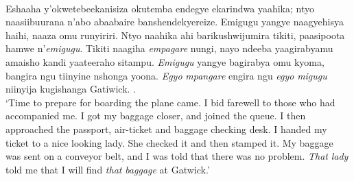 \documentclass[output=paper 		  ]{langscibook}
\begin{document}
\ex%
    \label{ex:asiimwe:51} \citet[207]{Asiimwe2014}\\
   Eshaaha y’okwetebeekanisiza okutemba endegye ekarindwa yaahika; ntyo naasiibuurana n’abo abaabaire banshendekyereize. Emigugu yangye naagyehisya haihi, naaza omu runyiriri. Ntyo naahika ahi barikushwijumira tikiti, paasipoota hamwe n’\emph{emigugu}. Tikiti naagiha \emph{empagare} nungi, nayo ndeeba yaagirabyamu amaisho kandi yaateeraho sitampu. \emph{Emigugu} yangye bagirabya omu kyoma, bangira ngu tiinyine nshonga yoona. \emph{Egyo} \emph{mpangare} engira ngu \emph{egyo} \emph{migugu} niinyija kugishanga Gatiwick. \hfill \citep[1]{Mugumya2010}.\\
‘Time to prepare for boarding the plane came. I bid farewell to those who had accompanied me. I got my baggage closer, and joined the queue. I then approached the passport, air-ticket and baggage checking desk. I handed my ticket to a nice looking lady. She checked it and then stamped it. My baggage was sent on a conveyor belt, and I was told that there was no problem. \emph{That} \emph{lady} told me that I will find \emph{that} \emph{baggage} at Gatwick.’
\end{document}
